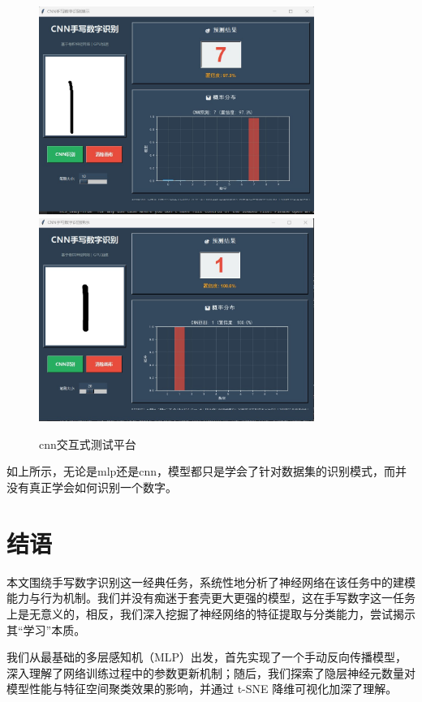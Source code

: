 \documentclass[12pt,a4paper]{article}
\begin{document}
\begin{figure}[H]
    \centering
    \includegraphics[width=0.8\textwidth]{../images/cnn/2025-06-21 063623.jpg}
    \includegraphics[width=0.8\textwidth]{../images/cnn/2025-06-21 063651.jpg}
    \caption{cnn交互式测试平台}
    \label{fig:interactive1}
\end{figure}
如上所示，无论是mlp还是cnn，模型都只是学会了针对数据集的识别模式，而并没有真正学会如何识别一个数字。


\section{结语}
本文围绕手写数字识别这一经典任务，系统性地分析了神经网络在该任务中的建模能力与行为机制。我们并没有痴迷于套壳更大更强的模型，这在手写数字这一任务上是无意义的，相反，我们深入挖掘了神经网络的特征提取与分类能力，尝试揭示其“学习”本质。

我们从最基础的多层感知机（MLP）出发，首先实现了一个手动反向传播模型，深入理解了网络训练过程中的参数更新机制；随后，我们探索了隐层神经元数量对模型性能与特征空间聚类效果的影响，并通过 t-SNE 降维可视化加深了理解。
\end{document}
